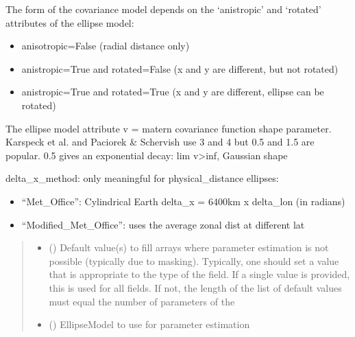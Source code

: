\documentclass[letterpaper,10pt,english]{sphinxmanual}
\begin{document}
\begin{fulllineitems}
\begin{fulllineitems}
\sphinxAtStartPar
The form of the covariance model depends on the ‘anistropic’ and
‘rotated’ attributes of the ellipse model:
\begin{itemize}
\item {}
\sphinxAtStartPar
anisotropic=False (radial distance only)

\item {}
\sphinxAtStartPar
anistropic=True and rotated=False (x and y are different, but not
rotated)

\item {}
\sphinxAtStartPar
anistropic=True and rotated=True (x and y are different, ellipse can
be rotated)

\end{itemize}

\sphinxAtStartPar
The ellipse model attribute v = matern covariance function shape
parameter.
Karspeck et al.  and Paciorek \& Schervish
use 3 and 4 but 0.5 and 1.5 are popular. 0.5 gives an exponential decay:
lim v\textendash{}\textgreater{}inf, Gaussian shape

\sphinxAtStartPar
delta\_x\_method: only meaningful for physical\_distance ellipses:
\begin{itemize}
\item {}
\sphinxAtStartPar
“Met\_Office”: Cylindrical Earth delta\_x = 6400km x delta\_lon
(in radians)

\item {}
\sphinxAtStartPar
“Modified\_Met\_Office”: uses the average zonal dist at different
lat

\end{itemize}
\begin{quote}\begin{description}
\begin{itemize}
\item {}
\sphinxAtStartPar
{} () \textendash{} Default value(s) to fill arrays where parameter estimation is not
possible (typically due to masking). Typically, one should set a
value that is appropriate to the type of the field. If a single
value is provided, this is used for all fields. If not, the length
of the list of default values must equal the number of parameters
of the 

\item {}
\sphinxAtStartPar
{} ({\hyperref[\detokenize{ellipse:glomar_gridding.ellipse.EllipseModel}]{}}) \textendash{} EllipseModel to use for parameter estimation


\end{itemize}
\end{description}
\end{quote}
\end{fulllineitems}
\end{fulllineitems}
\end{document}
